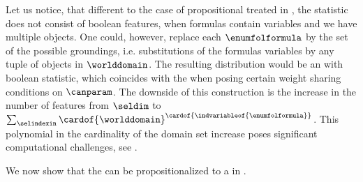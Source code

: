 
Let us notice, that different to the case of propositional \HybridLogicNetworks{} treated in , the statistic does not consist of boolean features, when formulas contain variables and we have multiple objects.
One could, however, replace each $\enumfolformula$ by the set of the possible groundings, i.e. substitutions of the formulas variables by any tuple of objects in $\worlddomain$.
The resulting distribution would be an \HybridLogicNetwork{} with boolean statistic, which coincides with the \HybridFOLNetwork{} when posing certain weight sharing conditions on $\canparam$.
The downside of this construction is the increase in the number of features from $\seldim$ to $\sum_{\selindexin} \cardof{\worlddomain}^{\cardof{\indvariableof{\enumfolformula}}}$.
This polynomial in the cardinality of the domain set increase poses significant computational challenges, see \cite{richardson_markov_2006}.

We now show that the \HybridFOLNetwork{} can be propositionalized to a \HybridLogicNetwork{} in \propositionalLogic{}.

